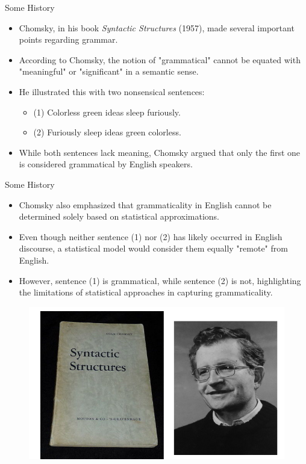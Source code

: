 \documentclass[handout]{beamer}
\begin{document}
\begin{frame}{Some History}
    \scriptsize
    \begin{itemize}
        \item Chomsky, in his book \textit{Syntactic Structures} (1957), made several important points regarding grammar. \cite{chomsky2009syntactic}
        \item According to Chomsky, the notion of "grammatical" cannot be equated with "meaningful" or "significant" in a semantic sense.
        \item He illustrated this with two nonsensical sentences:
        \begin{itemize}
            \scriptsize
            \item (1) Colorless green ideas sleep furiously.
            \item (2) Furiously sleep ideas green colorless.
        \end{itemize}
        \item While both sentences lack meaning, Chomsky argued that only the first one is considered grammatical by English speakers.
         \end{itemize}
\end{frame}


\begin{frame}{Some History}
    \scriptsize
    \begin{itemize}
        \item Chomsky also emphasized that grammaticality in English cannot be determined solely based on statistical approximations.
        \item Even though neither sentence (1) nor (2) has likely occurred in English discourse, a statistical model would consider them equally "remote" from English.
        \item However, sentence (1) is grammatical, while sentence (2) is not, highlighting the limitations of statistical approaches in capturing grammaticality.
    \end{itemize}
     \begin{figure}[h]
        	\includegraphics[scale = 0.4]{pics/chomsky.png}
        \end{figure}      
\end{frame}
\end{document}
